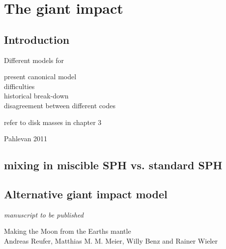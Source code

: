\chapter{The giant impact}
\label{ch05}
\graphicspath{{./05figs/}}



\section{Introduction}
Different models for 

present canonical model\\
difficulties\\
historical break-down\\
disagreement between different codes\\

\citep{Canup:2010p3713}
\cite{Benz:1985p1755}

refer to disk masses in chapter 3\\

\citep{Benz:1985p1755}
\citep{Benz:1989p1893}
\citep{Cameron:2000p1854}
\citep{Canup:1996p3541}
\citep{Canup:2001p1861}
\citep{Canup:2001p3295}
\citep{Canup:2004p115}
\citep{Canup:2005p1987}
\citep{Canup:2008p3551}
\citep{Ida:1997p3395}
\citep{Pahlevan:2007p2065}
\citep{Kokubo:2000p2195}
\citep{Ida:1997p3395}
\cite{Wiechert:2001p3543}
\cite{Canup:1996p3541}
\cite{Stevenson:1987p3540}
\cite{Wada:2006p1013}



\cite{2011E&PSL.301..433P} Pahlevan 2011


\section{mixing in miscible SPH vs. standard SPH}


\section{Alternative giant impact model}


\clearpage
\begin{flushright} \emph{manuscript to be published} \end{flushright}
{\Large Making the Moon from the Earths mantle} \vspace{0.5cm}\\
Andreas Reufer, Matthias M. M. Meier, Willy Benz and Rainer Wieler\\

